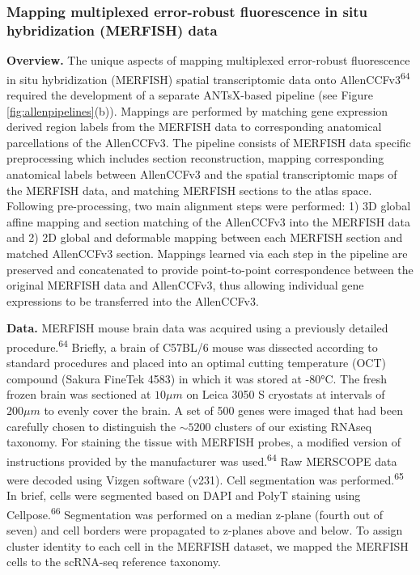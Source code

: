 \documentclass[
  12pt,
]{article}
\begin{document}
\hypertarget{mapping-multiplexed-error-robust-fluorescence-in-situ-hybridization-merfish-data}{%
\subsubsection{Mapping multiplexed error-robust fluorescence in situ
hybridization (MERFISH)
data}\label{mapping-multiplexed-error-robust-fluorescence-in-situ-hybridization-merfish-data}}

\textbf{Overview.} The unique aspects of mapping multiplexed
error-robust fluorescence in situ hybridization (MERFISH) spatial
transcriptomic data onto AllenCCFv3\textsuperscript{64} required the
development of a separate ANTsX-based pipeline (see Figure
\ref{fig:allenpipelines}(b)). Mappings are performed by matching gene
expression derived region labels from the MERFISH data to corresponding
anatomical parcellations of the AllenCCFv3. The pipeline consists of
MERFISH data specific preprocessing which includes section
reconstruction, mapping corresponding anatomical labels between
AllenCCFv3 and the spatial transcriptomic maps of the MERFISH data, and
matching MERFISH sections to the atlas space. Following pre-processing,
two main alignment steps were performed: 1) 3D global affine mapping and
section matching of the AllenCCFv3 into the MERFISH data and 2) 2D
global and deformable mapping between each MERFISH section and matched
AllenCCFv3 section. Mappings learned via each step in the pipeline are
preserved and concatenated to provide point-to-point correspondence
between the original MERFISH data and AllenCCFv3, thus allowing
individual gene expressions to be transferred into the AllenCCFv3.

\textbf{Data.} MERFISH mouse brain data was acquired using a previously
detailed procedure.\textsuperscript{64} Briefly, a brain of C57BL/6
mouse was dissected according to standard procedures and placed into an
optimal cutting temperature (OCT) compound (Sakura FineTek 4583) in
which it was stored at -80°C. The fresh frozen brain was sectioned at
\(10 \mu m\) on Leica 3050 S cryostats at intervals of \(200 \mu m\) to
evenly cover the brain. A set of 500 genes were imaged that had been
carefully chosen to distinguish the \(\sim5200\) clusters of our
existing RNAseq taxonomy. For staining the tissue with MERFISH probes, a
modified version of instructions provided by the manufacturer was
used.\textsuperscript{64} Raw MERSCOPE data were decoded using Vizgen
software (v231). Cell segmentation was performed.\textsuperscript{65} In
brief, cells were segmented based on DAPI and PolyT staining using
Cellpose.\textsuperscript{66} Segmentation was performed on a median
z-plane (fourth out of seven) and cell borders were propagated to
z-planes above and below. To assign cluster identity to each cell in the
MERFISH dataset, we mapped the MERFISH cells to the scRNA-seq reference
taxonomy.
\end{document}
